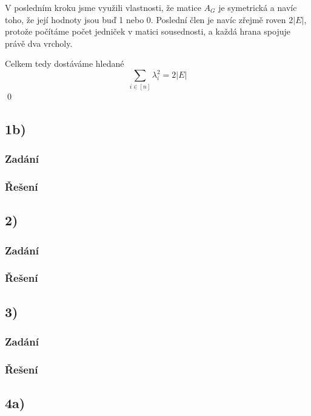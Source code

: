 \documentclass[../main.tex]{subfiles}
\begin{document}
V posledním kroku jsme využili vlastnosti, že matice $A_G$ je symetrická a navíc toho, že její hodnoty jsou buď 1 nebo 0. 
Poslední člen je navíc zřejmě roven $2|E|$, protože počítáme počet jedniček v matici sousednosti, a každá hrana spojuje právě dva vrcholy.  

Celkem tedy dostáváme hledané 
\begin{equation*}
    \sum_{i\in[n]} \lambda_i^2 = 2|E|
\end{equation*}
\qed 


\subsection{1b)}
\subsubsection*{Zadání}

\subsubsection*{Řešení}






\subsection{2)}
\subsubsection*{Zadání}

\subsubsection*{Řešení}




\subsection{3)}
\subsubsection*{Zadání}


\subsubsection*{Řešení}




\subsection{4a)}
\end{document}
